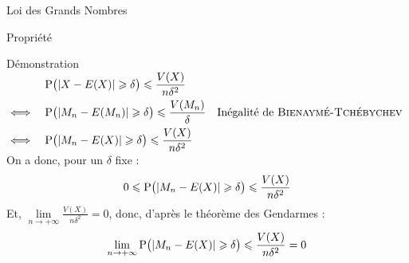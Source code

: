 \documentclass{cours}
\begin{document}
\begin{Gpartie}{Loi des Grands Nombres}
\begin{Spartie}{Propriété}
\begin{SSpartie}{Démonstration}
                $\begin{aligned}[t]
                    &\quad \mathrm{P}\big(\rvert X-E(X)\rvert\geqslant\delta\big)\leqslant\frac{V(X)}{n\delta^2} \\
                    \iff&\quad\mathrm{P}\big(\lvert M_n-E(M_n)\rvert\geqslant\delta\big)\leqslant\frac{V(M_n)}{\delta}\quad\text{Inégalité de \textsc{Bienaymé-Tchébychev}} \\
                    \iff&\quad\mathrm{P}\big(\lvert M_n-E(X)\rvert\geqslant\delta\big)\leqslant\frac{V(X)}{n\delta^2}
                \end{aligned}$
                On a donc, pour un $\delta$ fixe : \[0\leqslant\mathrm{P}\big(\lvert M_n-E(X)\rvert\geqslant\delta\big)\leqslant\frac{V(X)}{n\delta^2}\]
                Et, $\lim\limits_{n\to +\infty}\frac{V(X)}{n\delta^2}=0$, donc, d'après le théorème des Gendarmes : \[\lim\limits_{n\to +\infty}\mathrm{P}\big(\lvert M_n-E(X)\rvert\geqslant\delta\big)\leqslant\frac{V(X)}{n\delta^2}=0\]
            \end{SSpartie}
        \end{Spartie}
    \end{Gpartie}
\end{document}
